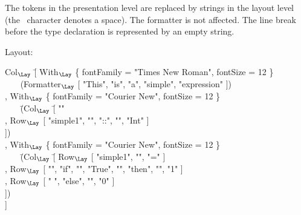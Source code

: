 

 The tokens in the presentation level are replaced by strings in the layout level (the \textvisiblespace~character denotes a space). The formatter is not affected. The line break before the type declaration is represented by an empty string. 

Layout:
\small \ttfamily
\begin{tabbing}
Col$_{\Lay}$ \= [  With$_{\Lay}$ \{ fontFamily = "Times New Roman", fontSize = 12 \}\\
                    \>  ~~~ (Formatter$_{\Lay}$ [ "This", "is", "a", "simple", "expression" ])\\
                    \> , With$_{\Lay}$ \{ fontFamily = "Courier New",  fontSize = 12 \}\\
                    \>  ~~~ \= (Col$_{\Lay}$ \= [ "" \\
                    \>          \>        \> , Row$_{\Lay}$ [ "simple1", "\textvisiblespace", "::",
                                                                           "\textvisiblespace", "Int" ]\\
                    \>          \>        \> ])\\
                    \> , With$_{\Lay}$ \{ fontFamily = "Courier New",  fontSize = 12 \}\\
                    \>  ~~~ \= (Col$_{\Lay}$ \= [ Row$_{\Lay}$ [ "simple1", "\textvisiblespace", "=" ]\\
                    \>          \>        \> , Row$_{\Lay}$  [ "\textvisiblespace\textvisiblespace", 
                                                                             "if", "\textvisiblespace", "True", "\textvisiblespace", 
                                                                             "then", "\textvisiblespace", "1" ]\\
                    \>          \>        \> , Row$_{\Lay}$ [ "\textvisiblespace\textvisiblespace\textvisiblespace
                                                                             \textvisiblespace\textvisiblespace\textvisiblespace
                                                                             \textvisiblespace\textvisiblespace\textvisiblespace                                                                                         \textvisiblespace ", "else", "\textvisiblespace", "0" ]\\
                    \>          \>        \> ])\\
                    \> ]
\end{tabbing}
\rmfamily \normalsize


